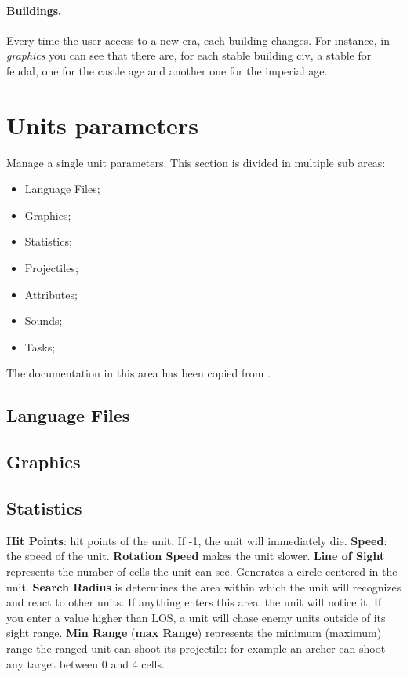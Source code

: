     \paragraph{Buildings.} Every time the user access to a new era, each building changes. For instance, in \textit{graphics} you can see that there are, for each stable building civ, a stable for feudal, one for the castle age and another one for the imperial age.

    \section{Units parameters}

    Manage a single unit parameters. This section is divided in multiple sub areas:

    \begin{itemize}
        \item Language Files;
        \item Graphics;
        \item Statistics;
        \item Projectiles;
        \item Attributes;
        \item Sounds;
        \item Tasks;
    \end{itemize}

    The documentation in this area has been copied from \cite{agewiki:2014}.

    \subsection{Language Files}

    \subsection{Graphics}

    \subsection{Statistics}

    \textbf{Hit Points}: hit points of the unit. If -1, the unit will immediately die\cite{genie:hitpoints}. \textbf{Speed}: the speed of the unit. \textbf{Rotation Speed} makes the unit slower. \textbf{Line of Sight} represents the number of cells the unit can see. Generates a circle centered in the unit. \textbf{Search Radius} is determines the area within which the unit will recognizes and react to other units.  If anything enters this area, the unit will notice it; If you enter a value higher than LOS, a unit will chase enemy units outside of its sight range. \textbf{Min Range} (\textbf{max Range}) represents the minimum (maximum) range the ranged unit can shoot its projectile: for example an archer can shoot any target between 0 and 4 cells\cite{agewiki:2014}.

